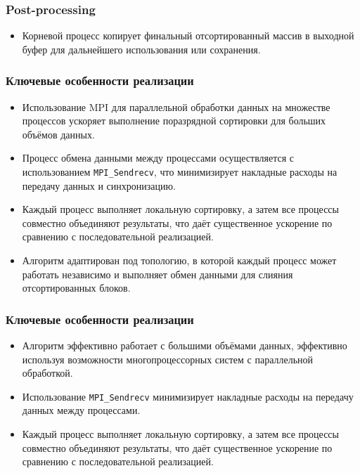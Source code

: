 \documentclass[12pt]{article}
\begin{document}
\subsubsection*{Post-processing}
\begin{itemize}
    \item Корневой процесс копирует финальный отсортированный массив в выходной буфер для дальнейшего использования или сохранения.
\end{itemize}

\subsubsection*{Ключевые особенности реализации}
\begin{itemize}
    \item Использование MPI для параллельной обработки данных на множестве процессов ускоряет выполнение поразрядной сортировки для больших объёмов данных.
    \item Процесс обмена данными между процессами осуществляется с использованием \texttt{MPI\_Sendrecv}, что минимизирует накладные расходы на передачу данных и синхронизацию.
    \item Каждый процесс выполняет локальную сортировку, а затем все процессы совместно объединяют результаты, что даёт существенное ускорение по сравнению с последовательной реализацией.
    \item Алгоритм адаптирован под топологию, в которой каждый процесс может работать независимо и выполняет обмен данными для слияния отсортированных блоков.
\end{itemize}

\subsubsection*{Ключевые особенности реализации}
\begin{itemize}
    \item Алгоритм эффективно работает с большими объёмами данных, эффективно используя возможности многопроцессорных систем с параллельной обработкой.
    \item Использование \texttt{MPI\_Sendrecv} минимизирует накладные расходы на передачу данных между процессами.
    \item Каждый процесс выполняет локальную сортировку, а затем все процессы совместно объединяют результаты, что даёт существенное ускорение по сравнению с последовательной реализацией.
\end{itemize}
\end{document}
